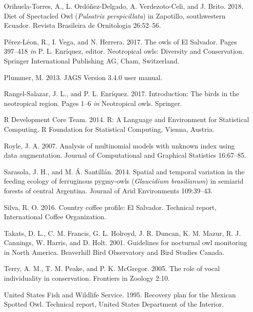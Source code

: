 \documentclass[
]{article}
\begin{document}
\leavevmode\hypertarget{ref-Orihuela-Torres:2018}{}%
Orihuela-Torres, A., L. Ordóñez-Delgado, A. Verdezoto-Celi, and J.
Brito. 2018. Diet of Spectacled Owl (\emph{Pulsatrix perspicillata}) in
Zapotillo, southwestern Ecuador. Revista Brasileira de Ornitologia
26:52--56.

\leavevmode\hypertarget{ref-Perez-Leon:2017}{}%
Pérez-Léon, R., I. Vega, and N. Herrera. 2017. The owls of El Salvador.
Pages 397--418 \emph{in} P. L. Enríquez, editor. Neotropical owls:
Diversity and Conservation. Springer International Publishing AG, Cham,
Switzerland.

\leavevmode\hypertarget{ref-Plummer:2013}{}%
Plummer, M. 2013. JAGS Version 3.4.0 user manual.

\leavevmode\hypertarget{ref-Rangel-Salazar:2017}{}%
Rangel-Salazar, J. L., and P. L. Enríquez. 2017. Introduction: The birds
in the neotropical region. Pages 1--6 \emph{in} Neotropical owls.
Springer.

\leavevmode\hypertarget{ref-R:2014}{}%
R Development Core Team. 2014. R: A Language and Environment for
Statistical Computing. R Foundation for Statistical Computing, Vienna,
Austria.

\leavevmode\hypertarget{ref-Royle:2007}{}%
Royle, J. A. 2007. Analysis of multinomial models with unknown index
using data augmentation. Journal of Computational and Graphical
Statistics 16:67--85.

\leavevmode\hypertarget{ref-Sarasola:2014}{}%
Sarasola, J. H., and M. Á. Santillán. 2014. Spatial and temporal
variation in the feeding ecology of ferruginous pygmy-owls
(\emph{Glaucidium brasilianum}) in semiarid forests of central
Argentina. Journal of Arid Environments 109:39--43.

\leavevmode\hypertarget{ref-Silva:2016}{}%
Silva, R. O. 2016. Country coffee profile: El Salvador. Technical
report, International Coffee Organization.

\leavevmode\hypertarget{ref-Takats:2001}{}%
Takats, D. L., C. M. Francis, G. L. Holroyd, J. R. Duncan, K. M. Mazur,
R. J. Cannings, W. Harris, and D. Holt. 2001. Guidelines for nocturnal
owl monitoring in North America. Beaverhill Bird Observatory and Bird
Studies Canada.

\leavevmode\hypertarget{ref-Terry:2005}{}%
Terry, A. M., T. M. Peake, and P. K. McGregor. 2005. The role of vocal
individuality in conservation. Frontiers in Zoology 2:10.

\leavevmode\hypertarget{ref-USFWS:1995}{}%
United States Fish and Wildlife Service. 1995. Recovery plan for the
Mexican Spotted Owl. Technical report, United States Department of the
Interior.
\end{document}

